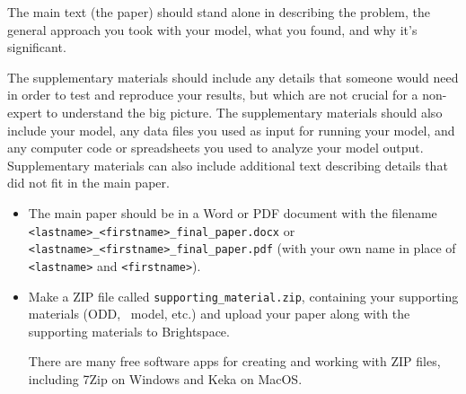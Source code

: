 \documentclass{jghandout}
\begin{document}
\begin{description}
\begin{description}
        The main text (the paper) should stand alone in describing the
        problem, the general approach you took with your model, what you
        found, and why it's significant.

        The supplementary materials should include any details that someone would
        need in order to test and reproduce your results, but which are not
        crucial for a non-expert to understand the big picture. The supplementary
        materials should also include your model, any data files you used as
        input for running your model, and any computer code or spreadsheets
        you used to analyze your model output. Supplementary materials can also
        include additional text describing details that did not fit in the
        main paper.
    \end{description}

    \sloppy
    \begin{itemize}
      \item The main paper should be in a Word or PDF document with the filename
        \lstinline|<lastname>_<firstname>_final_paper.docx| or
        \lstinline|<lastname>_<firstname>_final_paper.pdf| (with your own name in
        place of \lstinline|<lastname>| and \lstinline|<firstname>|).
      \item Make a ZIP file called \lstinline|supporting_material.zip|,
        containing your supporting materials (ODD, \NetLogo\ model, etc.) and upload
        your paper along with the supporting materials to Brightspace.

        There are many free software apps for creating and working with ZIP files,
        including 7Zip on Windows and Keka on MacOS.
    \end{itemize}
\end{description}
\end{document}

